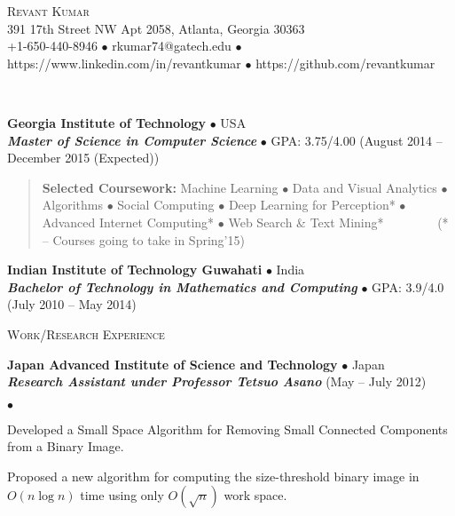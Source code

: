 \documentclass[10pt]{article}
\newcommand{\area}[2]{\begin{verse}\textbf{#1} #2 \end{verse}  }
\newcommand{\lineunder}{\\\vspace{-9pt}\hrulefill}
\newcommand{\header}[1]{{\normalsize\scshape{#1}} \lineunder}
\newcommand{\contact}[3]{\begin{center}{\huge\scshape{#1}}\\#2\\#3\end{center}}
\newenvironment{achievements}{\begin{list}{$\bullet$}{\topsep 0pt \itemsep 0pt}}{\end{list}}
\newcommand{\schoolWithCourses}[5]{
 \textbf{#1} $\bullet$ #2 \\
 \textbf{\emph{#3}} $\bullet$ #5 \hfill (#4) \\
}
\newcommand{\employer}[4]{ \textbf{#1} $\bullet$ #2 \\ \textbf{\emph{#4}} \hfill (#3)\\  }
\begin{document}
\small

\contact{Revant Kumar}
{391 17th Street NW Apt 2058, Atlanta, Georgia 30363}
{+1-650-440-8946 $\bullet$ rkumar74@gatech.edu $\bullet$ https://www.linkedin.com/in/revantkumar $\bullet$ https://github.com/revantkumar}

\vspace{2pt}

\vspace{-9pt}\header{Education}

\schoolWithCourses{Georgia Institute of Technology}{USA}{Master of Science in Computer Science}{August 2014 -- December 2015 (Expected)}{GPA: 3.75/4.00}
\vspace{-2pt}
\area{Selected Coursework:}{Machine Learning {\tiny$\bullet$} Data and Visual Analytics {\tiny$\bullet$} Algorithms {\tiny$\bullet$} Social Computing {\tiny$\bullet$}  Deep Learning for Perception* {\tiny$\bullet$}  Advanced Internet Computing* {\tiny$\bullet$} Web Search \& Text Mining* \ \ \ \ \ \ \ \  (* -- Courses going to take in Spring'15)}

\schoolWithCourses{Indian Institute of Technology Guwahati}{India}{Bachelor of Technology in Mathematics and Computing}{July 2010 -- May 2014}{GPA: 3.9/4.0}

\vspace{3pt}

\header{Work/Research Experience}


\employer{Japan Advanced Institute of Science and Technology}{Japan}{May -- July 2012}{Research Assistant under Professor Tetsuo Asano}
	\begin{achievements}	
	\item Developed a Small Space Algorithm for Removing Small Connected Components from a Binary Image.
	\item Proposed a new algorithm for computing the size-threshold binary image in $O(n \log n)$ time using only $O(\sqrt{n})$ work space.
	\end{achievements}
\end{document}
